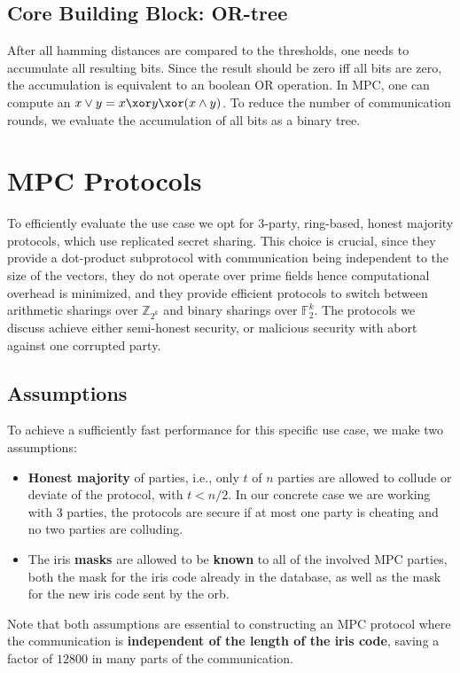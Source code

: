 \documentclass[a4paper,11pt,
]{article}
\newcommand{\F}{\ensuremath{\mathbb{F}}\xspace}
\newcommand{\Z}{\ensuremath{\mathbb{Z}}\xspace}
\begin{document}
\subsection{Core Building Block: OR-tree}

After all hamming distances are compared to the thresholds, one needs to accumulate all resulting bits. Since the result should be zero iff all bits are zero, the accumulation is equivalent to an boolean OR operation. In MPC, one can compute an $x \vee y = x \xor y \xor (x \wedge y)$. To reduce the number of communication rounds, we evaluate the accumulation of all bits as a binary tree.


\section{MPC Protocols}\label{sec:prelim:mpc}

To efficiently evaluate the use case we opt for 3-party, ring-based, honest majority protocols, which use replicated secret sharing. This choice is crucial, since they provide a dot-product subprotocol with communication being independent to the size of the vectors, they do not operate over prime fields hence computational overhead is minimized, and they provide efficient protocols to switch between arithmetic sharings over $\Z_{2^k}$ and binary sharings over $\F_2^k$. The protocols we discuss achieve either semi-honest security, or malicious security with abort against one corrupted party.

\subsection{Assumptions}

To achieve a sufficiently fast performance for this specific use case, we make two assumptions:
\begin{itemize}
    \item \textbf{Honest majority} of parties, i.e., only $t$ of $n$ parties are allowed to collude or deviate of the protocol, with $t < n/2$. In our concrete case we are working with 3 parties, the protocols are secure if at most one party is cheating and no two parties are colluding.
    \item The iris \textbf{masks} are allowed to be \textbf{known} to all of the involved MPC parties, both the mask for the iris code already in the database, as well as the mask for the new iris code sent by the orb.
\end{itemize}
Note that both assumptions are essential to constructing an MPC protocol where the communication is \textbf{independent of the length of the iris code}, saving a factor of $12800$ in many parts of the communication.
\end{document}
